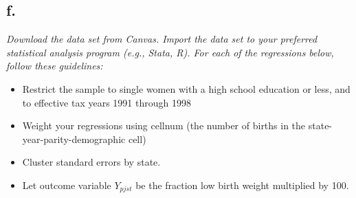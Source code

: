 \documentclass[
]{article}
\newenvironment{Shaded}{\begin{snugshade}}{\end{snugshade}}
\newcommand{\CommentTok}[1]{\textcolor[rgb]{0.56,0.35,0.01}{\textit{#1}}}
\newcommand{\DecValTok}[1]{\textcolor[rgb]{0.00,0.00,0.81}{#1}}
\newcommand{\KeywordTok}[1]{\textcolor[rgb]{0.13,0.29,0.53}{\textbf{#1}}}
\newcommand{\NormalTok}[1]{#1}
\newcommand{\OperatorTok}[1]{\textcolor[rgb]{0.81,0.36,0.00}{\textbf{#1}}}
\newcommand{\StringTok}[1]{\textcolor[rgb]{0.31,0.60,0.02}{#1}}
\providecommand{\tightlist}{%
  \setlength{\itemsep}{0pt}\setlength{\parskip}{0pt}}
\begin{document}
\hypertarget{f.}{%
\subsection{f.~}\label{f.}}

\emph{Download the data set from Canvas. Import the data set to your
preferred statistical analysis program (e.g., Stata, R). For each of the
regressions below, follow these guidelines:}

\begin{itemize}
\tightlist
\item
  Restrict the sample to single women with a high school education or
  less, and to effective tax years 1991 through 1998\\
\item
  Weight your regressions using cellnum (the number of births in the
  state-year-parity-demographic cell)\\
\item
  Cluster standard errors by state.\\
\item
  Let outcome variable \(Y_{pjst}\) be the fraction low birth weight
  multiplied by 100.
\end{itemize}

\begin{Shaded}
\end{Shaded}
\end{document}
